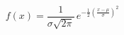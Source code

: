 \begin{equation}
f(x) = \frac{1}{\sigma\sqrt{2\pi} }\,e^{-\frac 12
\left(\frac{x-\mu}{\sigma}\right)^2 }
\label{eq:NormalDistribution}
\end{equation}